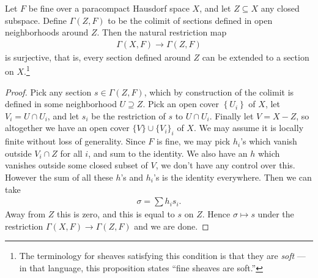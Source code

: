 \documentclass[11pt]{amsart}
\begin{document}
\begin{proposition} Let $F$ be fine over a paracompact Hausdorf space $X$, and let $Z \subseteq X$ any closed subspace. Define $\Gamma(Z,F)$ to be the colimit of sections defined in open neighborhoods around $Z$. Then the natural restriction map
\begin{align*}
    \Gamma(X,F) \to \Gamma(Z,F)
\end{align*}
is surjective, that is, every section defined around $Z$ can be extended to a section on $X$.\footnote{The terminology for sheaves satisfying this condition is that they are \emph{soft} --- in that language, this proposition states ``fine sheaves are soft.''}
\end{proposition}
\begin{proof}
Pick any section $s\in \Gamma(Z,F)$, which by construction of the colimit is defined in some neighborhood $U \supseteq Z$. Pick an open cover $\left\{ U_i \right\}$ of $X$, let $V_i = U \cap U_i$, and let $s_i$ be the restriction of $s$ to $U \cap U_i$. Finally let $V = X - Z$, so altogether we have an open cover $\{V\} \cup \{V_i\}_i$ of $X$. We may assume it is locally finite without loss of generality. Since $F$ is fine, we may pick $h_i$'s which vanish outside $V_i \cap Z$ for all $i$, and sum to the identity. We also have an $h$ which vanishes outside some closed subset of $V$, we don't have any control over this. However the sum of all these $h$'s and $h_i$'s is the identity everywhere. Then we can take
\begin{align*}
    \sigma = \sum h_i s_i.
\end{align*}
Away from $Z$ this is zero, and this is equal to $s$ on $Z$. Hence $\sigma \mapsto s$ under the restriction $\Gamma(X,F) \to \Gamma(Z,F)$ and we are done.
\end{proof}
\end{document}
